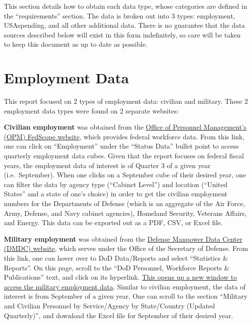 \documentclass[
]{book}
\begin{document}
This section details how to obtain each data type, whose categories are defined in the ``requirements'' section. The data is broken out into 3 types: employment, USAspending, and all other additional data. There is no guarantee that the data sources described below will exist in this form indefinitely, so care will be taken to keep this document as up to date as possible.

\hypertarget{employment-data}{%
\section{Employment Data}\label{employment-data}}

This report focused on 2 types of employment data: civilian and military. These 2 employment data types were found on 2 separate websites:

\textbf{Civilian employment} was obtained from the \href{https://www.fedscope.opm.gov/}{Office of Personnel Management's (OPM) FedScope website}, which provides federal workforce data. From this link, one can click on ``Employment'' under the ``Status Data'' bullet point to access quarterly employment data cubes. Given that the report focuses on federal fiscal years, the employment data of interest is of Quarter 3 of a given year (i.e.~September). When one clicks on a September cube of their desired year, one can filter the data by agency type (``Cabinet Level'') and location (``United States'' and a state of one's choice) in order to get the civilian employment numbers for the Departments of Defense (which is an aggregate of the Air Force, Army, Defense, and Navy cabinet agencies), Homeland Security, Veterans Affairs, and Energy. This data can be exported out as a PDF, CSV, or Excel file.

\textbf{Military employment} was obtained from the \href{https://dwp.dmdc.osd.mil/dwp/app/main}{Defense Manpower Data Center (DMDC) website}, which serves under the Office of the Secretary of Defense. From this link, one can hover over to DoD Data/Reports and select ``Statistics \& Reports''. On this page, scroll to the ``DoD Personnel, Workforce Reports \& Publications'' text, and click on its hyperlink. \href{https://dwp.dmdc.osd.mil/dwp/app/dod-data-reports/workforce-reports}{This opens up a new window to access the military employment data}. Similar to civilian employment, the data of interest is from September of a given year. One can scroll to the section ``Military and Civilian Personnel by Service/Agency by State/Country (Updated Quarterly)'', and download the Excel file for September of their desired year.
\end{document}
